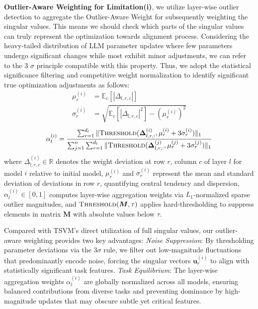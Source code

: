 \textbf{Outlier-Aware Weighting for Limitation(i)}, we utilize layer-wise outlier detection to aggregate the Outlier-Aware Weight for subsequently weighting the singular values.  This means we should check which parts of the singular values can truly represent the optimization towards alignment process. Considering the heavy-tailed distribution of LLM parameter updates where few parameters undergo significant changes while most exhibit minor adjustments, we can refer to the 3 $\sigma$ principle compatible with this property. Thus, we adopt the statistical significance filtering and competitive weight normalization to identify significant true optimization adjustments as follows:
\begin{align}
    \mu_r^{(i)}    & = \mathbb{E}_c[|\Delta_{l,r,c}|]                            \\
    \sigma_r^{(i)} & = \sqrt{\mathbb{E}_c[|\Delta_{l,r,c}|^2] - (\mu_r^{(i)})^2}
\end{align}
\begin{equation}
    \alpha^{(i)}_l = \frac{\sum_{r=1}^{d_l} \|\textsc{Threshold}(\bm{\Delta}_{l,r,:}^{(i)}, \mu_r^{(i)}+3\sigma_r^{(i)})\|_1}{\sum_{j=1}^n \sum_{r=1}^{d_l} \|\textsc{Threshold}(\bm{\Delta}_{l,r,:}^{(j)}, \mu_r^{(j)}+3\sigma_r^{(j)})\|_1}
\end{equation}
where $\Delta_{l,r,c}^{(i)} \in \mathbb{R}$ denotes the weight deviation at row $r$, column $c$ of layer $l$ for model $i$ relative to initial model, $\mu_r^{(i)}$ and $\sigma_r^{(i)}$ represent the mean and standard deviation of deviations in row $r$, quantifying central tendency and dispersion, $\alpha_l^{(i)} \in [0,1]$ computes layer-wise aggregation weights via $L_1$-normalized sparse outlier magnitudes, and $\textsc{Threshold}(\bm{M}, \tau)$ applies hard-thresholding to suppress elements in matrix $\bm{M}$ with absolute values below $\tau$.

Compared with TSVM's direct utilization of full singular values, our outlier-aware weighting provides two key advantages:
\emph{Noise Suppression}: By thresholding parameter deviations via the $3\sigma$ rule, we filter out low-magnitude fluctuations that predominantly encode noise, forcing the singular vectors $\bm{u}_r^{(i)}$ to align with statistically significant task features.
\emph{Task Equilibrium}: The layer-wise aggregation weights $\alpha_l^{(i)}$ are globally normalized across all models, ensuring balanced contributions from diverse tasks and preventing dominance by high-magnitude updates that may obscure subtle yet critical features.

